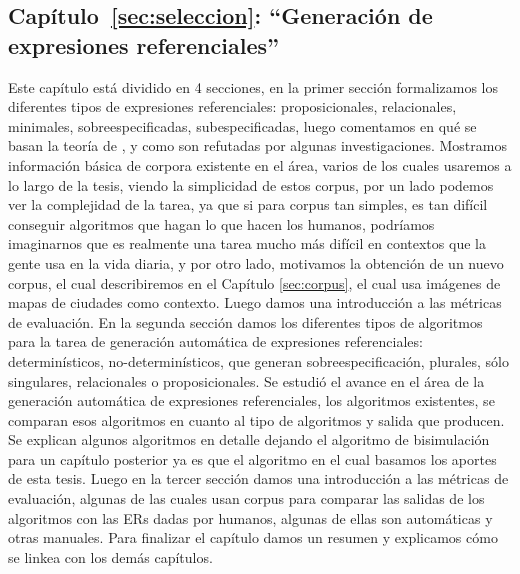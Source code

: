 \subsection{Cap\'itulo~\ref{sec:seleccion}: ``Generaci\'on de expresiones referenciales''} 
Este cap\'itulo est\'a dividido en 4 secciones, en la primer secci\'on formalizamos los diferentes tipos de expresiones referenciales: proposicionales, relacionales, minimales, sobreespecificadas, subespecificadas, luego comentamos en qu\'e se basan la teor\'ia de \cite{clark1992arenas,clark96}, \cite{Clark-Marshall81} y como son refutadas por algunas investigaciones. Mostramos informaci\'on b\'asica de corpora existente en el \'area, varios de los cuales usaremos a lo largo de la tesis, viendo la simplicidad de estos corpus, por un lado podemos ver la complejidad de la tarea, ya que si para corpus tan simples, es tan dif\'icil conseguir algoritmos que hagan lo que hacen los humanos, podr\'iamos imaginarnos que es realmente una tarea mucho m\'as dif\'icil en contextos que la gente usa en la vida diaria, y por otro lado, motivamos la obtenci\'on de un nuevo  corpus, el cual describiremos en el Cap\'itulo \ref{sec:corpus}, el cual usa im\'agenes de mapas de ciudades como contexto. Luego damos una introducci\'on a las m\'etricas de evaluaci\'on. En la segunda secci\'on damos los diferentes tipos de algoritmos para la tarea de generaci\'on autom\'atica de expresiones referenciales: determin\'isticos, no-determin\'isticos, que generan sobreespecificaci\'on, plurales, s\'olo singulares, relacionales o proposicionales. Se estudi\'o el avance en el \'area de la generaci\'on autom\'atica de expresiones referenciales, los algoritmos existentes, se comparan esos algoritmos en cuanto al tipo de algoritmos y salida que producen. Se explican algunos algoritmos en detalle dejando el algoritmo de bisimulaci\'on para un cap\'itulo posterior ya es que el algoritmo en el cual basamos los aportes de esta tesis. Luego en la tercer secci\'on damos una introducci\'on a las m\'etricas de evaluaci\'on, algunas de las cuales usan corpus para comparar las salidas de los algoritmos con las ERs dadas por humanos, algunas de ellas son autom\'aticas y otras manuales. Para finalizar el cap\'itulo damos un resumen y explicamos c\'omo se linkea con los dem\'as cap\'itulos.



